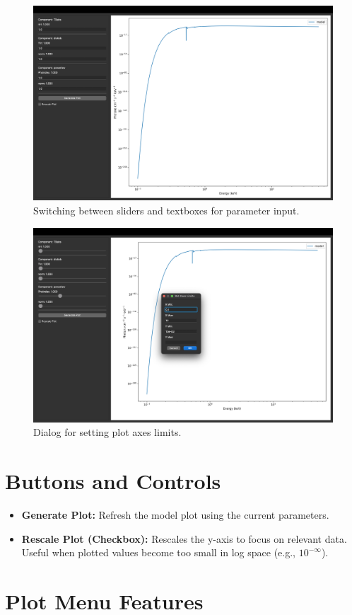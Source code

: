 \documentclass[11pt]{article}
\begin{document}
\begin{figure}[H]
    \centering
    \includegraphics[width=0.7\linewidth]{documentation_images/textboxes.png}
    \caption{Switching between sliders and textboxes for parameter input.}
\end{figure}

\begin{figure}[H]
    \centering
    \includegraphics[width=0.7\linewidth]{documentation_images/set_axes_limits.png}
    \caption{Dialog for setting plot axes limits.}
\end{figure}

\section*{Buttons and Controls}

\begin{itemize}
    \item \textbf{Generate Plot:} Refresh the model plot using the current parameters.
    \item \textbf{Rescale Plot (Checkbox):} Rescales the y-axis to focus on relevant data. Useful when plotted values become too small in log space (e.g., $10^{-\infty}$).
\end{itemize}

\section*{Plot Menu Features}
\end{document}
